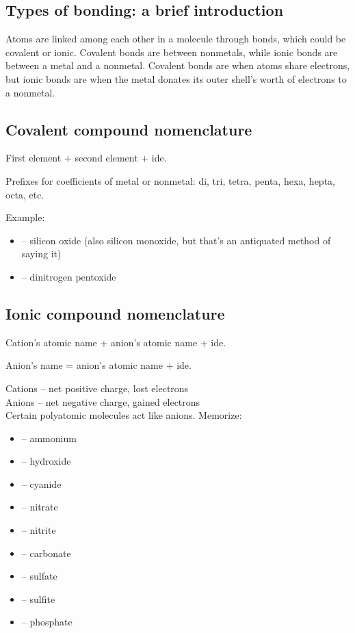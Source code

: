 \documentclass[letterpaper, 12pt]{article}
\begin{document}
	\subsection{Types of bonding: a brief introduction}
	Atoms are linked among each other in a molecule through bonds, which could be covalent or ionic. Covalent bonds are between nonmetals, while ionic bonds are between a metal and a nonmetal. Covalent bonds are when atoms share electrons, but ionic bonds are when the metal donates its outer shell's worth of electrons to a nonmetal.
	
	\subsection{Covalent compound nomenclature}
	First element + second element + ide.
	
	Prefixes for coefficients of metal or nonmetal: di, tri, tetra, penta, hexa, hepta, octa, etc.
	
	Example:
	
	\begin{itemize}
		\item {} -- silicon oxide (also silicon monoxide, but that's an antiquated method of saying it)
		\item {} -- dinitrogen pentoxide
	\end{itemize}
	
	\subsection{Ionic compound nomenclature}
	Cation's atomic name + anion's atomic name + ide.
	
	Anion's name = anion's atomic name + ide.
	
	Cations -- net positive charge, lost electrons\\
	Anions -- net negative charge, gained electrons\\
	
	Certain polyatomic molecules act like anions. Memorize:
	\begin{itemize}
		\item {} -- ammonium
		\item {} -- hydroxide
		\item {} -- cyanide
		\item {} -- nitrate
		\item {} -- nitrite
		\item {} -- carbonate
		\item {} -- sulfate
		\item {} -- sulfite
		\item {} -- phosphate
	\end{itemize}
	
\end{document}
